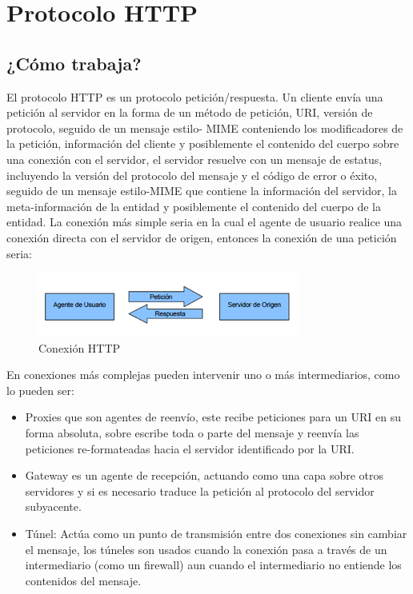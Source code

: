 
\chapter{Protocolo HTTP} %

\label{ch:protocolo_http} %


\lipsum[1]


\section{¿Cómo trabaja?}

El protocolo HTTP es un protocolo petición/respuesta. Un cliente envía una petición al servidor en la forma de un método de petición, URI, versión de protocolo, seguido de un mensaje estilo-
MIME conteniendo los modificadores de la petición, información del cliente y posiblemente el contenido del cuerpo sobre una conexión con el servidor, el servidor resuelve con un mensaje de estatus, incluyendo la versión del protocolo del mensaje y el código de error o éxito, seguido de un mensaje estilo-MIME que contiene la información del servidor, la meta-información de la entidad y posiblemente el contenido del cuerpo de la entidad.
La conexión más simple seria en la cual el agente de usuario realice una conexión directa con el servidor de origen, entonces la conexión de una petición seria:

\begin{figure}[h]
  \centering
    \includegraphics[scale=1]{gfx/conexion_http}
  \caption{Conexión HTTP}
  \label{conexionhttp}
\end{figure}


En conexiones más complejas pueden intervenir uno o más intermediarios, como lo pueden ser:

  \begin{itemize}
     \item Proxies que son agentes de reenvío, este recibe peticiones para un URI en su forma absoluta, sobre escribe toda o parte del mensaje y reenvía las peticiones re-formateadas hacia el servidor identificado por la URI.
     \item Gateway es un agente de recepción, actuando como una capa sobre otros servidores y si es necesario traduce la petición al protocolo del servidor subyacente.
     \item Túnel: Actúa como un punto de transmisión entre dos conexiones sin cambiar el mensaje, los túneles son usados cuando la conexión pasa a través de un intermediario (como un firewall) aun cuando el intermediario no entiende los contenidos del mensaje.
  \end{itemize}


